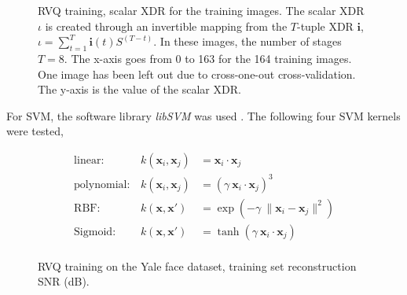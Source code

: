 											\begin{figure}[t]
											\centering
											\caption{RVQ training, scalar XDR for the training images.  The scalar XDR $\iota$ is created through an invertible mapping from the $T$-tuple XDR $\mathbf{i}$, $\iota=\sum\limits_{t=1}^{T}\mathbf{i}(t)S^{(T-t)}$.  In these images, the number of stages $T=8$.  The x-axis goes from 0 to 163 for the 164 training images.  One image has been left out due to cross-one-out cross-validation.  The y-axis is the value of the scalar XDR.}
											\label{fig:RVQ_faceRecognition_sSoC}	
											\end{figure}

For SVM, the software library \emph{libSVM} was used \cite{2011_JNL_libSVM_Chang}.  The following four SVM kernels were tested, 

\begin{equation}
\begin{array}{lllllll}
\mathrm{linear:} & k(\mathbf{x}_i, \mathbf{x}_j) &= \mathbf{x}_i \cdot \mathbf{x}_j\\ 
\mathrm{polynomial:} & k(\mathbf{x}_i, \mathbf{x}_j) &= (\gamma \ \mathbf{x}_i \cdot \mathbf{x}_j)^3\\
\mathrm{RBF:} & k(\mathbf{x}, \mathbf{x'}) &= \exp(-\gamma \ \|\mathbf{x}_i - \mathbf{x}_j\|^2)\\
\mathrm{Sigmoid:} & k(\mathbf{x}, \mathbf{x'}) &= \tanh(\gamma \ \mathbf{x}_i \cdot \mathbf{x}_j)\\
\end{array}
\end{equation}


											\begin{figure}[t]
											\centering
											\caption{RVQ training on the Yale face dataset, training set reconstruction SNR (dB).}
											\label{fig:RVQ_trg_reconstruction_SNR}	
											\end{figure}

